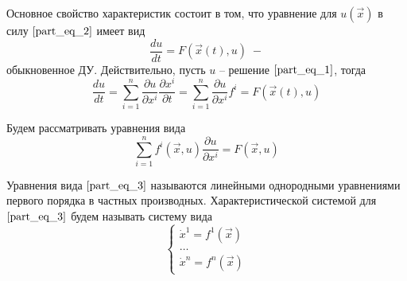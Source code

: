 \documentclass[a4paper, 12pt]{article}
\begin{document}
    Основное свойство характеристик состоит в том, что уравнение для $u \left( \overrightarrow{x} \right) $ в силу $\eqref{part_eq_2}$ имеет вид 
    \begin{equation*}
        \frac{du}{dt} = F \left( \overrightarrow{x} \left( t \right) , u \right) \; -
    \end{equation*}
    обыкновенное ДУ. Действительно, пусть $u$ -- решение $\eqref{part_eq_1}$, тогда 
    \begin{equation*}
        \frac{du}{dt} = \sum \limits_{i = 1}^{n} \frac{\partial u}{\partial x^i} \frac{\partial x^i}{\partial t} = \sum \limits_{i = 1}^{n} \frac{\partial u}{\partial x^i} f^i = F \left( \overrightarrow{x} \left( t \right) , u \right) 
    \end{equation*}

    Будем рассматривать уравнения вида
    \begin{equation}
        \sum \limits_{i = 1}^{n} f^{i} \left( \overrightarrow{x}, u \right) \frac{\partial u}{\partial x^{i}} = F \left( \overrightarrow{x}, u \right) 
        \label{part_eq_3}
    \end{equation}

    \begin{definition}
        Уравнения вида $\eqref{part_eq_3}$ называются линейными однородными уравнениями первого порядка в частных производных. Характеристической системой для $\eqref{part_eq_3}$ будем называть систему вида
        \begin{equation}
            \begin{cases}
                \dot{x}^1 = f^1 \left( \overrightarrow{x} \right) \\
                \dots                                             \\
                \dot{x}^n = f^n \left( \overrightarrow{x} \right) 
            \end{cases}
            \label{part_eq_4}
        \end{equation}
    \end{definition}
\end{document}
